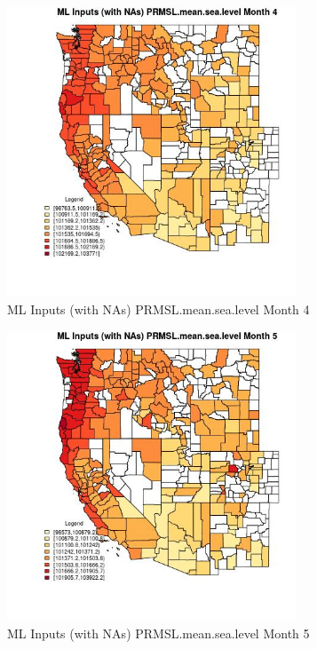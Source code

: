 \begin{figure} 
\centering  
\includegraphics[width=0.77\textwidth]{Code_Outputs/Report_ML_input_PM25_Step4_part_f_de_duplicated_aves_prioritize_24hr_obswNAs_CountyPRMSLmeansealevelmedianMonth4.jpg} 
\caption{\label{fig:Report_ML_input_PM25_Step4_part_f_de_duplicated_aves_prioritize_24hr_obswNAsCountyPRMSLmeansealevelmedianMonth4}ML Inputs (with NAs) PRMSL.mean.sea.level Month 4} 
\end{figure} 
 

\begin{figure} 
\centering  
\includegraphics[width=0.77\textwidth]{Code_Outputs/Report_ML_input_PM25_Step4_part_f_de_duplicated_aves_prioritize_24hr_obswNAs_CountyPRMSLmeansealevelmedianMonth5.jpg} 
\caption{\label{fig:Report_ML_input_PM25_Step4_part_f_de_duplicated_aves_prioritize_24hr_obswNAsCountyPRMSLmeansealevelmedianMonth5}ML Inputs (with NAs) PRMSL.mean.sea.level Month 5} 
\end{figure} 
 

